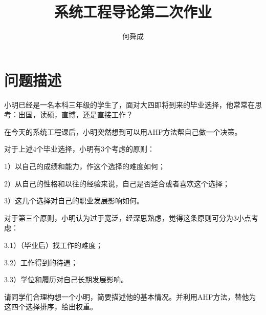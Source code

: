 \documentclass[UTF8]{ctexart}
\author{何舜成}
\title{系统工程导论第二次作业}
\begin{document}
\maketitle
\section{问题描述}
小明已经是一名本科三年级的学生了，面对大四即将到来的毕业选择，他常常在思考：出国，读硕，直博，还是直接工作？\par
在今天的系统工程课后，小明突然想到可以用AHP方法帮自己做一个决策。\par
对于上述4个毕业选择，小明有3个考虑的原则：\par
1）以自己的成绩和能力，作这个选择的难度如何；\par
2）从自己的性格和以往的经验来说，自己是否适合或者喜欢这个选择；\par
3）这几个选择对自己的职业发展影响如何。\par
对于第三个原则，小明认为过于宽泛，经深思熟虑，觉得这条原则可分为3小点考虑：\par
3.1）（毕业后）找工作的难度；\par
3.2）工作得到的待遇；\par
3.3）学位和履历对自己长期发展影响。\par
请同学们合理构想一个小明，简要描述他的基本情况。并利用AHP方法，替他为这四个选择排序，给出权重。\par
\end{document}
